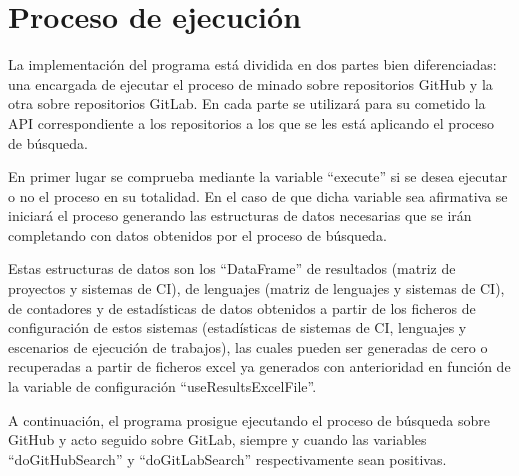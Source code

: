 
\section{Proceso de ejecución}
La implementación del programa está dividida en dos partes bien diferenciadas: una encargada de ejecutar el proceso de minado sobre repositorios GitHub y la otra sobre repositorios GitLab. En cada parte se utilizará para su cometido la API correspondiente a los repositorios a los que se les está aplicando el proceso de búsqueda.

En primer lugar se comprueba mediante la variable ``execute'' si se desea ejecutar o no el proceso en su totalidad. En el caso de que dicha variable sea afirmativa se iniciará el proceso generando las estructuras de datos necesarias que se irán completando con datos obtenidos por el proceso de búsqueda. 

Estas estructuras de datos son los ``DataFrame'' de resultados (matriz de proyectos y sistemas de CI), de lenguajes (matriz de lenguajes y sistemas de CI), de contadores y de estadísticas de datos obtenidos a partir de los ficheros de configuración de estos sistemas (estadísticas de sistemas de CI, lenguajes y escenarios de ejecución de trabajos), las cuales pueden ser generadas de cero o recuperadas a partir de ficheros excel ya generados con anterioridad en función de la variable de configuración ``useResultsExcelFile''.

A continuación, el programa prosigue ejecutando el proceso de búsqueda sobre GitHub y acto seguido sobre GitLab, siempre y cuando las variables ``doGitHubSearch'' y ``doGitLabSearch'' respectivamente sean positivas.

